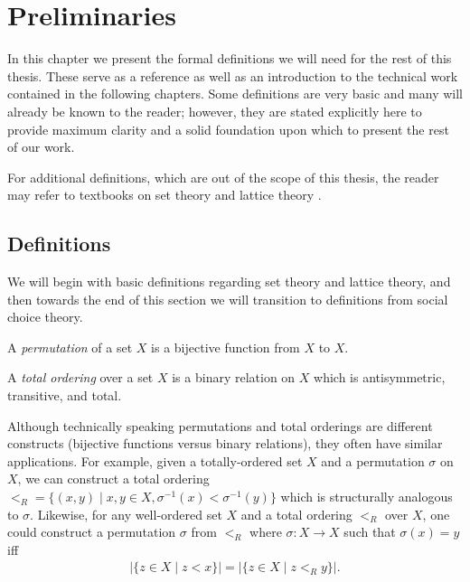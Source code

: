 
\chapter{Preliminaries}

	In this chapter we present the formal definitions we will need for the rest of this thesis. These serve as a reference as well as an introduction to the technical work contained in the following chapters. Some definitions are very basic and many will already be known to the reader; however, they are stated explicitly here to provide maximum clarity and a solid foundation upon which to present the rest of our work.

	For additional definitions, which are out of the scope of this thesis, the reader may refer to textbooks on set theory \cite{kunen1980set} and lattice theory \cite{birkhoff1995lattice}.

\section{Definitions}

	We will begin with basic definitions regarding set theory and lattice theory, and then towards the end of this section we will transition to definitions from social choice theory.

	\begin{definition}
		A \emph{permutation} of a set $X$ is a bijective function from $X$ to $X$.
	\end{definition}

	\begin{definition}
		A \emph{total ordering} over a set $X$ is a binary relation on $X$ which is antisymmetric, transitive, and total.
	\end{definition}

	Although technically speaking permutations and total orderings are different constructs (bijective functions versus binary relations), they often have similar applications. For example, given a totally-ordered set $X$ and a permutation $\sigma$ on $X$, we can construct a total ordering $<_R = \{(x,y) \mid x, y \in X, \sigma^{-1}(x) < \sigma^{-1}(y)\}$ which is structurally analogous to $\sigma$. Likewise, for any well-ordered set $X$ and a total ordering $<_R$ over $X$, one could construct a permutation $\sigma$ from $<_R$ where $\sigma : X \to X$ such that $\sigma(x) = y$ iff
	\begin{align*}
		|\{z \in X \mid z < x\}| = |\{z \in X \mid z <_R y\}|.
	\end{align*}

